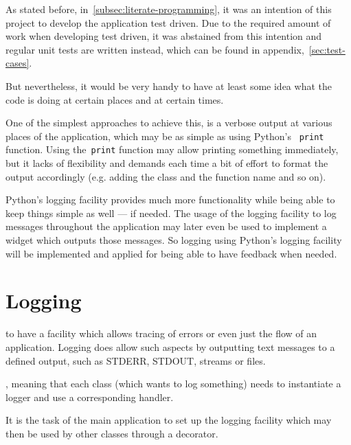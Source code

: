 \documentclass[%
    a4paper,    %
    justified,  %
    nobib,      %
    openany     %
]{tufte-book}
\begin{document}
As stated before, in~\autoref{subsec:literate-programming}, it was an intention
of this project to develop the application test driven. Due to the required amount
of work when developing test driven, it was abstained from this intention and
regular unit tests are written instead, which can be found in
appendix,~\autoref{sec:test-cases}.

But nevertheless, it would be very handy to have at least some idea what the
code is doing at certain places and at certain times.

One of the simplest approaches to achieve this, is a verbose output at various
places of the application, which may be as simple as using Python's
~\verb=print= function. Using the~\verb=print= function may allow
printing something immediately, but it lacks of flexibility and demands each
time a bit of effort to format the output accordingly (e.g. adding the class and
the function name and so on).

Python's logging facility provides much more functionality while being able to
keep things simple as well --- if needed. The usage of the logging facility to
log messages throughout the application may later even be used to implement a
widget which outputs those messages. So logging using Python's logging facility
will be implemented and applied for being able to have feedback when needed.%

\chapter{Logging}
\label{appendix:chap:logging}

 to have a facility which allows tracing of
errors or even just the flow of an application. Logging does allow such aspects
by outputting text messages to a defined output, such as STDERR, STDOUT, streams
or files.

, meaning that each class
(which wants to log something) needs to instantiate a logger and use a
corresponding handler.

 It is the task
of the main application to set up the logging facility which may then be used by
other classes through a decorator.
\end{document}
